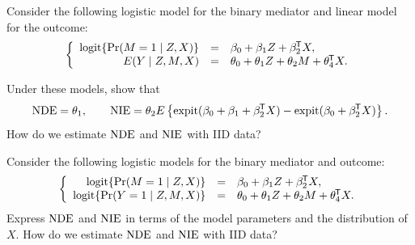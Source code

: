 \begin{HomeworkProblem}\label{exr:27-9}
Consider the following logistic model for the binary mediator and linear model for the outcome:
\[
\left\{\begin{array}{rcl}
\textup{logit}\{ \operatorname{Pr}(M  = 1\mid Z, X) \}&=&  \beta_0 + \beta_1 Z + \beta_2^{\mkern-1.5mu\mathsf{T}} X, \\
E(Y\mid Z,M,X) &=& \theta_0 + \theta_1 Z + \theta_2 M +   \theta_4^{\mkern-1.5mu\mathsf{T}} X .
\end{array}\right.
\]


Under these models, show that
\[
\mathrm{NDE} = \theta_1  ,\qquad
\mathrm{NIE} = \theta_2 E \left\{  \textup{expit}(\beta_0 + \beta_1  + \beta_2^{\mkern-1.5mu\mathsf{T}} X)
-  \textup{expit}(\beta_0   + \beta_2^{\mkern-1.5mu\mathsf{T}} X)  \right\}.
\]
How do we estimate $\mathrm{NDE}$ and $\mathrm{NIE}$ with IID data?






\end{HomeworkProblem}

\begin{HomeworkProblem}\label{exr:27-10}

Consider the following logistic models for the binary mediator and outcome:
\[
\left\{\begin{array}{rcl}
\textup{logit}\{ \operatorname{Pr}(M  = 1\mid Z, X) \}&=&  \beta_0 + \beta_1 Z + \beta_2^{\mkern-1.5mu\mathsf{T}} X, \\
\textup{logit} \{ \operatorname{Pr}(Y = 1 \mid Z,M,X ) \} &=& \theta_0 + \theta_1 Z + \theta_2 M +   \theta_4^{\mkern-1.5mu\mathsf{T}} X.
\end{array}\right.
\]
Express $\mathrm{NDE}$ and $\mathrm{NIE}$ in terms of the model parameters and the distribution of $X$. How do we estimate $\mathrm{NDE}$ and $\mathrm{NIE}$ with IID data?




\end{HomeworkProblem}

